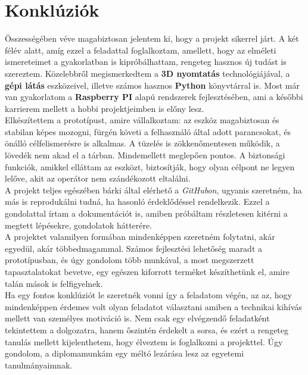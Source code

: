 \chapter{Konklúziók}
Összességében véve magabiztosan jelentem ki, hogy a projekt sikerrel járt. A két félév alatt, amíg ezzel a feladattal foglalkoztam, amellett, hogy az elméleti ismereteimet a gyakorlatban is kipróbálhattam, rengeteg hasznos új tudást is szereztem. Közelebbről megismerkedtem a \textbf{3D nyomtatás} technológiájával, a \textbf{gépi látás} eszközeivel, illetve számos hasznos \textbf{Python} könyvtárral is. Most már van gyakorlatom a \textbf{Raspberry PI} alapú rendszerek fejlesztésében, ami a későbbi karrierem mellett a hobbi projektjeimben is előny lesz.\\

Elkészítettem a prototípust, amire vállalkoztam: az eszköz magabiztosan és stabilan képes mozogni, fürgén követi a felhasználó által adott parancsokat, és önálló célfelismerésre is alkalmas. A tüzelés is zökkenőmentesen működik, a lövedék nem akad el a tárban. Mindemellett meglepően pontos. A biztonsági funkciók, amikkel elláttam az eszközt, biztosítják, hogy olyan célpont ne legyen lelőve, akit az operátor nem szándékozott eltalálni. \\

A projekt teljes egészében bárki által elérhető a \textsl{GitHubon}, ugyanis szeretném, ha más is reprodukálni tudná, ha hasonló érdeklődéssel rendelkezik. Ezzel a gondolattal írtam a dokumentációt is, amiben próbáltam részletesen kitérni a megtett lépésekre, gondolatok hátterére.\\

A projektet valamilyen formában mindenképpen szeretném folytatni, akár egyedül, akár többedmagammal. Számos fejlesztési lehetőség maradt a prototípusban, és úgy gondolom több munkával, a most megszerzett tapasztalatokat bevetve, egy egészen kiforrott terméket készíthetünk el, amire talán mások is felfigyelnek.\\

Ha egy fontos konklúziót le szeretnék vonni így a feladatom végén, az az, hogy mindenképpen érdemes volt olyan feladatot választani amiben a technikai kihívás mellett van személyes motiváció is. Nem csak egy elvégzendő feladatként tekintettem a dolgozatra, hanem őszintén érdekelt a sorsa, és ezért a rengeteg tanulás mellett kijelenthetem, hogy élveztem is foglalkozni a projekttel. Úgy gondolom, a diplomamunkám egy méltó lezárása lesz az egyetemi tanulmányaimnak. 
